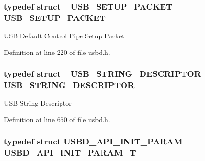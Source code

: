\subsubsection[{\texorpdfstring{U\+S\+B\+\_\+\+S\+E\+T\+U\+P\+\_\+\+P\+A\+C\+K\+ET}{USB_SETUP_PACKET}}]{\setlength{\rightskip}{0pt plus 5cm}typedef struct {\bf \+\_\+\+U\+S\+B\+\_\+\+S\+E\+T\+U\+P\+\_\+\+P\+A\+C\+K\+ET} {\bf U\+S\+B\+\_\+\+S\+E\+T\+U\+P\+\_\+\+P\+A\+C\+K\+ET}}\hypertarget{group__USBD__Core_ga4a940f7627cc7e9f0bb693cc0fce8637}{}\label{group__USBD__Core_ga4a940f7627cc7e9f0bb693cc0fce8637}
U\+SB Default Control Pipe Setup Packet 

Definition at line 220 of file usbd.\+h.

\subsubsection[{\texorpdfstring{U\+S\+B\+\_\+\+S\+T\+R\+I\+N\+G\+\_\+\+D\+E\+S\+C\+R\+I\+P\+T\+OR}{USB_STRING_DESCRIPTOR}}]{\setlength{\rightskip}{0pt plus 5cm}typedef struct {\bf \+\_\+\+U\+S\+B\+\_\+\+S\+T\+R\+I\+N\+G\+\_\+\+D\+E\+S\+C\+R\+I\+P\+T\+OR} {\bf U\+S\+B\+\_\+\+S\+T\+R\+I\+N\+G\+\_\+\+D\+E\+S\+C\+R\+I\+P\+T\+OR}}\hypertarget{group__USBD__Core_gabccfa24c1955b99a76219a89b8e6f3b6}{}\label{group__USBD__Core_gabccfa24c1955b99a76219a89b8e6f3b6}
U\+SB String Descriptor 

Definition at line 660 of file usbd.\+h.

\subsubsection[{\texorpdfstring{U\+S\+B\+D\+\_\+\+A\+P\+I\+\_\+\+I\+N\+I\+T\+\_\+\+P\+A\+R\+A\+M\+\_\+T}{USBD_API_INIT_PARAM_T}}]{\setlength{\rightskip}{0pt plus 5cm}typedef struct {\bf U\+S\+B\+D\+\_\+\+A\+P\+I\+\_\+\+I\+N\+I\+T\+\_\+\+P\+A\+R\+AM}  {\bf U\+S\+B\+D\+\_\+\+A\+P\+I\+\_\+\+I\+N\+I\+T\+\_\+\+P\+A\+R\+A\+M\+\_\+T}}\hypertarget{group__USBD__Core_gaa6e8171941c1ae63afed95974e0f18e3}{}\label{group__USBD__Core_gaa6e8171941c1ae63afed95974e0f18e3}


